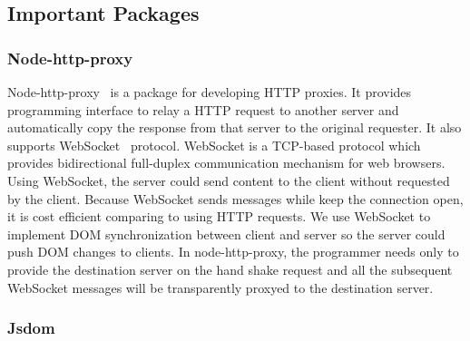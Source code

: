 


\subsection{Important \nodejs Packages}

\subsubsection{Node-http-proxy}

Node-http-proxy~\cite{nodeproxy} is a \nodejs package for developing HTTP proxies.
It provides programming interface to relay a HTTP request to another server and
automatically copy the response from that server to the original requester.
It also supports WebSocket~\cite{rfc6455} protocol.
WebSocket is a TCP-based protocol which provides bidirectional full-duplex communication
mechanism for web browsers.
Using WebSocket, the server could send content to the client without requested
by the client.
Because WebSocket sends messages while keep the connection open,
it is cost efficient comparing to using HTTP requests.
We use WebSocket to implement DOM synchronization between client and server so
the server could push DOM changes to clients.
In node-http-proxy,
the programmer needs only to provide the destination server on the hand shake
request and all the subsequent WebSocket messages will
be transparently proxyed to the destination server.

\subsubsection{Jsdom}


